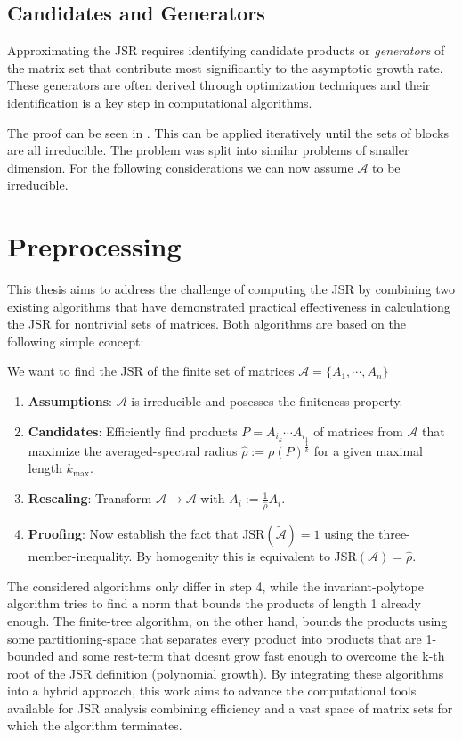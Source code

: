 \subsection*{Candidates and Generators}
Approximating the JSR requires identifying candidate products or \emph{generators} of the matrix set that contribute most significantly to the asymptotic growth rate. These generators are often derived through optimization techniques and their identification is a key step in computational algorithms.
 
The proof can be seen in \citep{jungersJointSpectralRadius2009}.
This can be applied iteratively until the sets of blocks are all irreducible.
The problem was split into similar problems of smaller dimension.
For the following considerations we can now assume $\mathcal{A}$ to be irreducible.

\section{Preprocessing}
\label{sec:preprocessing}
This thesis aims to address the challenge of computing the JSR by combining two existing algorithms that have demonstrated practical effectiveness in calculationg the JSR for nontrivial sets of matrices. Both algorithms are based on the following simple concept:

We want to find the JSR of the finite set of matrices $\mathcal{A} = \{A_1, \cdots, A_n\}$
\begin{enumerate}
    \item \textbf{Assumptions}: $\mathcal{A}$ is irreducible and posesses the finiteness property. 
    \item \textbf{Candidates}: Efficiently find products $P = A_{i_k} \cdots A_{i_1}$ of matrices from $\mathcal{A}$ that maximize the averaged-spectral radius $\hat{\rho} := \rho(P)^\frac{1}{k}$ for a given maximal length $k_{\text{max}}$.
    \item \textbf{Rescaling}: Transform $\mathcal{A} \to \tilde{\mathcal{A}}$ with $\tilde{A_i} := \frac{1}{\hat{\rho}} A_i$.
    \item \textbf{Proofing}: Now establish the fact that JSR$(\tilde{\mathcal{A}}) = 1$ using the three-member-inequality. By homogenity this is equivalent to JSR$(\mathcal{A}) = \hat{\rho}$.
\end{enumerate}

The considered algorithms only differ in step 4, while the invariant-polytope algorithm tries to find a norm that bounds the products of length 1 already enough. The finite-tree algorithm, on the other hand, bounds the products using some partitioning-space that separates every product into products that are 1-bounded and some rest-term that doesnt grow fast enough to overcome the k-th root of the JSR definition (polynomial growth).
By integrating these algorithms into a hybrid approach, this work aims to advance the computational tools available for JSR analysis combining efficiency and a vast space of matrix sets for which the algorithm terminates.
